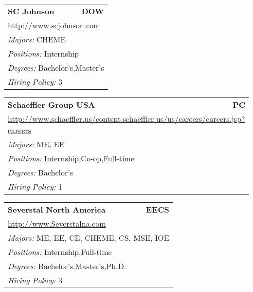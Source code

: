 \documentclass[twoside]{article}
\begin{document}
\begin{center}
\begin{multicols}{3}
\begin{FlushLeft}
\begin{minipage}{.9\columnwidth}
\end{minipage}
 
\begin{minipage}{.9\columnwidth}\begin{tabularx}{.95\columnwidth}{Xr}
                 {\Large\bf SC Johnson} & {\Large\bf DOW}\\
    \multicolumn{2}{p{.95\columnwidth}}{\url{http://www.scjohnson.com}}\\
    \multicolumn{2}{p{.95\columnwidth}}{\emph{Majors:} CHEME}\\
    \multicolumn{2}{p{.95\columnwidth}}{\emph{Positions:} Internship}\\
    \multicolumn{2}{p{.95\columnwidth}}{\emph{Degrees:} Bachelor's,Master's}\\
    \multicolumn{2}{p{.95\columnwidth}}{\emph{Hiring Policy:} 3}\\
    \end{tabularx}
    
\end{minipage}
 
\begin{minipage}{.9\columnwidth}\begin{tabularx}{.95\columnwidth}{Xr}
                 {\Large\bf Schaeffler Group USA} & {\Large\bf PC}\\
    \multicolumn{2}{p{.95\columnwidth}}{\url{http://www.schaeffler.us/content.schaeffler.us/us/careers/careers.jsp?careers}}\\
    \multicolumn{2}{p{.95\columnwidth}}{\emph{Majors:} ME, EE}\\
    \multicolumn{2}{p{.95\columnwidth}}{\emph{Positions:} Internship,Co-op,Full-time}\\
    \multicolumn{2}{p{.95\columnwidth}}{\emph{Degrees:} Bachelor's}\\
    \multicolumn{2}{p{.95\columnwidth}}{\emph{Hiring Policy:} 1}\\
    \end{tabularx}
    
\end{minipage}
 
\begin{minipage}{.9\columnwidth}\begin{tabularx}{.95\columnwidth}{Xr}
                 {\Large\bf Severstal North America} & {\Large\bf EECS}\\
    \multicolumn{2}{p{.95\columnwidth}}{\url{http://www.Severstalna.com}}\\
    \multicolumn{2}{p{.95\columnwidth}}{\emph{Majors:} ME, EE, CE, CHEME, CS, MSE, IOE}\\
    \multicolumn{2}{p{.95\columnwidth}}{\emph{Positions:} Internship,Full-time}\\
    \multicolumn{2}{p{.95\columnwidth}}{\emph{Degrees:} Bachelor's,Master's,Ph.D.}\\
    \multicolumn{2}{p{.95\columnwidth}}{\emph{Hiring Policy:} 3}\\
    \end{tabularx}
    

\end{minipage}
\end{FlushLeft}
\end{multicols}
\end{center}
\end{document}
